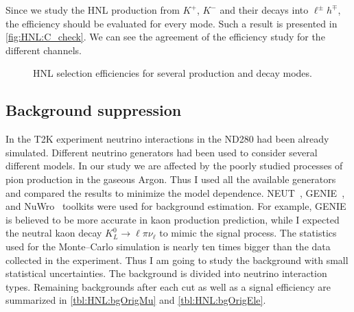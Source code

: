 \documentclass[../main.tex]{subfiles}
\begin{document}
Since we study the HNL production from $K^+$,  $K^-$ and their decays into $\ell^{\pm}h^{\mp}$, the efficiency should be evaluated for every mode. Such a result is presented in \autoref{fig:HNL:C_check}. We can see the agreement of the efficiency study for the different channels.

\begin{figure}[!ht]
  \begin{minipage}{0.49\linewidth}
  \end{minipage}
  \hfill
  \begin{minipage}{0.49\linewidth}
  \end{minipage}
  \caption{HNL selection efficiencies for several production and decay modes.}
  \label{fig:HNL:C_check}
\end{figure}

\subsection{Background suppression}
\label{sec:HNL:bg}
In the T2K experiment neutrino interactions in the ND280 had been already simulated. Different neutrino generators had been used to consider several different models. In our study we are affected by the poorly studied processes of pion production in the gaseous Argon. Thus I used all the available generators and compared the results to minimize the model dependence. NEUT~\cite{Hayato2002}, GENIE~\cite{Andreopoulos2010}, and NuWro~\cite{Zmuda2015} toolkits were used for background estimation. For example, GENIE is believed to be more accurate in kaon production prediction, while I expected the neutral kaon decay $K^0_L\to\ell\pi\nu_\ell$ to mimic the signal process. The statistics used for the Monte--Carlo simulation is nearly ten times bigger than the data collected in the experiment. Thus I am going to study the background with small statistical uncertainties. The background is divided into neutrino interaction types. Remaining backgrounds after each cut as well as a signal efficiency are summarized in \autoref{tbl:HNL:bgOrigMu} and \autoref{tbl:HNL:bgOrigEle}.
\end{document}

